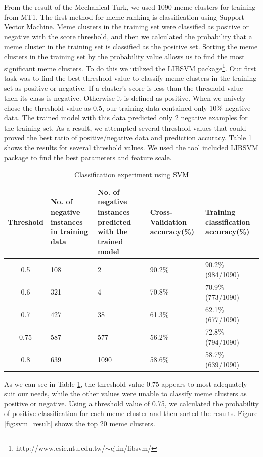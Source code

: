 \documentclass{sig-alternate}
\begin{document}
From the result of the Mechanical Turk, we used 1090 meme clusters for training from MT1. The first method for meme ranking is classification using Support Vector Machine. Meme clusters in the training set were classified as positive or negative with the score threshold, and then we calculated the probability that a meme cluster in the training set is classified as the positive set. Sorting the meme clusters in the training set by the probability value allows us to find the most significant meme clusters. To do this we utilized the LIBSVM package\footnote{http://www.csie.ntu.edu.tw/$\sim$cjlin/libsvm/}. Our first task was to find the best threshold value to classify meme clusters in the training set as positive or negative. If a cluster's score is less than the threshold value then its class is negative.  Otherwise it is defined as positive. When we naively chose the threshold value as 0.5, our training data contained only 10\% negative data.   The trained model with this data predicted only 2 negative examples for the training set. As a result, we attempted several threshold values that could proved the best ratio of positive/negative data and prediction accuracy. Table \ref{table:svm} shows the results for several threshold values. We used the tool included LIBSVM package to find the best parameters and feature scale.

\begin{table}[t!h]
\begin{center}
\begin{tabular}{c|p{3.5cm}|p{3.5cm}|p{3.5cm}|p{3.5cm}}

Threshold&No. of negative instances in training data&No. of negative instances predicted with the trained model&Cross-Validation accuracy(\%)&Training classification accuracy(\%)\\
\hline
0.5&108&2&90.2\%&90.2\% (984/1090)\\
0.6&321&4&70.8\%&70.9\% (773/1090)\\
0.7&427&38&61.3\%&62.1\% (677/1090)\\
0.75&587&577&56.2\%&72.8\% (794/1090)\\
0.8&639&1090&58.6\%&58.7\% (639/1090)\\
\end{tabular}
\caption{Classification experiment using SVM}
\label{table:svm}
\end{center}
\end{table}

As we can see in Table \ref{table:svm}, the threshold value 0.75 appears to most adequately suit our needs, while the other values were unable to classify meme clusters as positive or negative. Using a threshold value of  0.75, we calculated the probability of positive classification for each meme cluster and then sorted the results. Figure \ref{fig:svm_result} shows the top 20 meme clusters.
\end{document}
